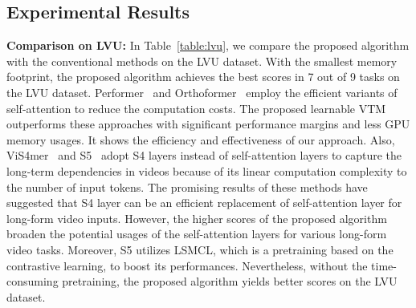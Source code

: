 \documentclass{article}
\begin{document}
\subsection{Experimental Results}
\label{sec:exp_results}
\noindent\textbf{Comparison on LVU:} In Table~\ref{table:lvu}, we compare the proposed algorithm with the conventional methods on the LVU dataset. With the smallest memory footprint, the proposed algorithm achieves the best scores in 7 out of 9 tasks on the LVU dataset. Performer~\citep{choromanski2020performer} and Orthoformer~\citep{patrick2021orthoformer} employ the efficient variants of self-attention to reduce the computation costs. The proposed learnable VTM outperforms these approaches with significant performance margins and less GPU memory usages. It shows the efficiency and effectiveness of our approach. Also, ViS4mer~\citep{islam2022vis4mer} and S5~\citep{wang2023s5} adopt S4 layers instead of self-attention layers to capture the long-term dependencies in videos because of its linear computation complexity to the number of input tokens. The promising results of these methods have suggested that S4 layer can be an efficient replacement of self-attention layer for long-form video inputs. However, the higher scores of the proposed algorithm broaden the potential usages of the self-attention layers for various long-form video tasks. Moreover, S5 utilizes LSMCL, which is a pretraining based on the contrastive learning, to boost its performances. Nevertheless, without the time-consuming pretraining, the proposed algorithm yields better scores on the LVU dataset.
\end{document}
